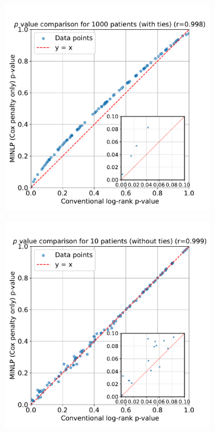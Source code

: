 \documentclass[article]{jss}
\begin{document}
\begin{figure}
\begin{subfigure}[t]{0.32\textwidth}
  \caption{\label{fig:compare-p-value-100-patients}}
\end{subfigure}
\begin{subfigure}[t]{0.32\textwidth}
  \centering
  \includegraphics[width=\linewidth]{p_value_comparison_1000_patients.pdf}
  \caption{\label{fig:compare-p-value-1000-patients}}
\end{subfigure}
\begin{subfigure}[t]{0.32\textwidth}
  \centering
  \includegraphics[width=\linewidth]{p_value_comparison_10_patients_no_ties.pdf}

\end{subfigure}
\end{figure}
\end{document}
